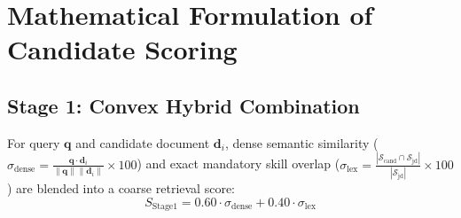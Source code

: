 \documentclass[12pt,a4paper]{article}
\begin{document}
\section{Mathematical Formulation of Candidate Scoring}

\subsection{Stage 1: Convex Hybrid Combination}
For query $\mathbf{q}$ and candidate document $\mathbf{d}_i$, dense semantic similarity ($\sigma_{\text{dense}} = \frac{\mathbf{q} \cdot \mathbf{d}_i}{\|\mathbf{q}\| \|\mathbf{d}_i\|} \times 100$) and exact mandatory skill overlap ($\sigma_{\text{lex}} = \frac{|\mathcal{S}_{\text{cand}} \cap \mathcal{S}_{\text{jd}}|}{|\mathcal{S}_{\text{jd}}|} \times 100$) are blended into a coarse retrieval score:
{\small
\begin{equation}
    S_{\text{Stage1}} = 0.60 \cdot \sigma_{\text{dense}} + 0.40 \cdot \sigma_{\text{lex}}
\end{equation}
}
\end{document}
